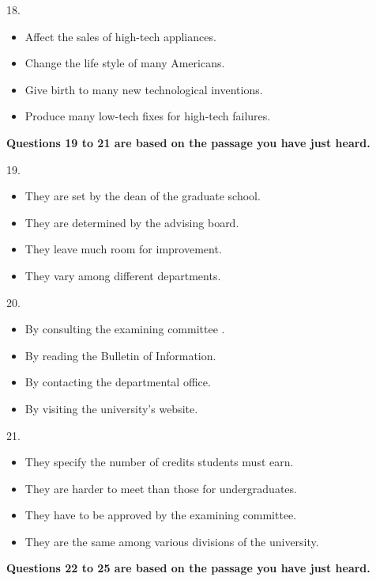 \documentclass[UTF8,11pt]{ctexart}
\begin{document}
18.


\begin{itemize}[leftmargin=2em,itemsep=.2em,topsep=.4em]\item[A.] Affect the sales of high-tech appliances.
\item[B.] Change the life style of many Americans.
\item[C.] Give birth to many new technological inventions.
\item[D.] Produce many low-tech fixes for high-tech failures.
\end{itemize}

\textbf{Questions 19 to 21 are based on the passage you have just heard.}


19.


\begin{itemize}[leftmargin=2em,itemsep=.2em,topsep=.4em]\item[A.] They are set by the dean of the graduate school.
\item[B.] They are determined by the advising board.
\item[C.] They leave much room for improvement.
\item[D.] They vary among different departments.
\end{itemize}

20.


\begin{itemize}[leftmargin=2em,itemsep=.2em,topsep=.4em]\item[A.] By consulting the examining committee .
\item[B.] By reading the Bulletin of Information.
\item[C.] By contacting the departmental office.
\item[D.] By visiting the university’s website.
\end{itemize}

21.


\begin{itemize}[leftmargin=2em,itemsep=.2em,topsep=.4em]\item[A.] They specify the number of credits students must earn.
\item[B.] They are harder to meet than those for undergraduates.
\item[C.] They have to be approved by the examining committee.
\item[D.] They are the same among various divisions of the university.
\end{itemize}

\textbf{Questions 22 to 25 are based on the passage you have just heard.}
\end{document}
